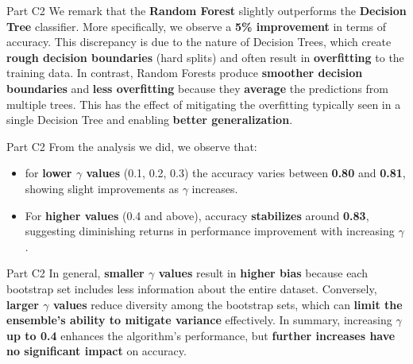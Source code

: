 \documentclass{beamer}
\begin{document}
    \begin{frame}{Part C2}
    \hfill\break\hfill\break
    We remark that the \textbf{Random Forest } slightly outperforms the \textbf{Decision Tree} classifier. More specifically, we observe a \textbf{5\% improvement} in terms of accuracy. This discrepancy is due to the nature of Decision Trees, which create \textbf{rough decision boundaries} (hard splits) and often result in \textbf{overfitting} to the training data. In contrast, Random Forests produce \textbf{smoother decision boundaries} and \textbf{less overfitting} because they \textbf{average} the predictions from multiple trees. This has the effect of mitigating the overfitting typically seen in a single Decision Tree and enabling \textbf{better generalization}.
    \end{frame}

    \begin{frame}{Part C2}
    \hfill\break\hfill\break
    From the analysis we did, we observe that:
    \begin{itemize}
        \item for \textbf{lower $\gamma$ values} (0.1, 0.2, 0.3) the accuracy varies between \textbf{0.80} and \textbf{0.81}, showing slight improvements as $\gamma$ increases.
        \item For \textbf{higher values} (0.4 and above), accuracy \textbf{stabilizes} around \textbf{0.83},  suggesting diminishing returns in performance improvement with increasing $\gamma$.
    \end{itemize}
    \end{frame}

    \begin{frame}{Part C2}
       In general, \textbf{smaller $\gamma$ values} result in \textbf{higher bias} because each bootstrap set includes less information about the entire dataset.
       \hfill\break\hfill\break
       Conversely, \textbf{larger $\gamma$ values} reduce diversity among the bootstrap sets, which can \textbf{limit the ensemble's ability to mitigate variance} effectively.
       \hfill\break\hfill\break
       In summary, increasing $\gamma$ \textbf{up to 0.4} enhances the algorithm's performance, but \textbf{further increases have no significant impact} on accuracy.
    \end{frame}
\end{document}
